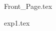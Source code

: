 \documentclass[12pt]{article}
\begin{document}

{Front_Page.tex}
\newpage

\flushleft{\tableofcontents}
\newpage

{exp1.tex}
\newpage
\end{document}
